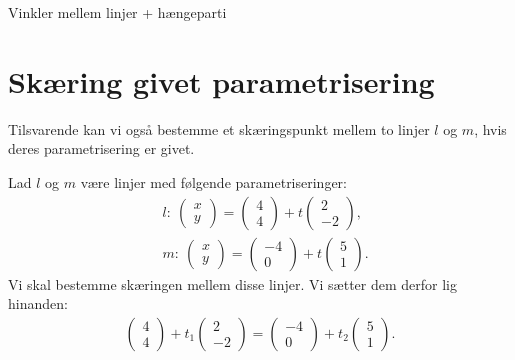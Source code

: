 \begin{center}
\Huge
Vinkler mellem linjer + hængeparti
\end{center}

\section*{Skæring givet parametrisering}
Tilsvarende kan vi også bestemme et skæringspunkt mellem to linjer $l$ og $m$, hvis deres parametrisering er givet. 
\begin{exa}
	Lad $l$ og $m$ være linjer med følgende parametriseringer:
	\begin{align*}
		&l: \ 
		\begin{pmatrix}
			x \\ y
		\end{pmatrix} = 
		\begin{pmatrix}
			4 \\ 4
		\end{pmatrix} + t
		\begin{pmatrix}
			2 \\ -2
		\end{pmatrix},\\
		&m: \ 
		\begin{pmatrix}
			x \\ y 
		\end{pmatrix} = 
		\begin{pmatrix}
			-4 \\ 0
		\end{pmatrix} + t
		\begin{pmatrix}
			5 \\ 1
		\end{pmatrix}.
	\end{align*}
	Vi skal bestemme skæringen mellem disse linjer. Vi sætter dem derfor lig hinanden:
	\begin{align*}
		\begin{pmatrix}
			4 \\ 4
		\end{pmatrix} + t_1
		\begin{pmatrix}
			2 \\ -2
		\end{pmatrix} =
		\begin{pmatrix}
			-4 \\ 0
		\end{pmatrix} + t_2
		\begin{pmatrix}
			5 \\ 1
		\end{pmatrix}.

\end{align*}
\end{exa}
